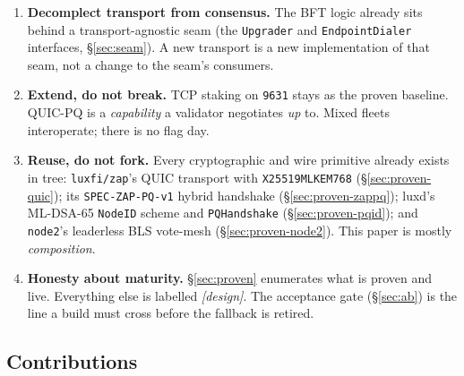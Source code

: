 \documentclass[11pt,a4paper]{article}
\newcommand{\code}[1]{\texttt{#1}}
\begin{document}
\begin{enumerate}[nosep]
  \item \textbf{Decomplect transport from consensus.} The BFT logic
        already sits behind a transport-agnostic seam (the \code{Upgrader}
        and \code{EndpointDialer} interfaces, \S\ref{sec:seam}). A new
        transport is a new implementation of that seam, not a change to
        the seam's consumers.
  \item \textbf{Extend, do not break.} TCP staking on
        \code{9631} stays as the proven baseline. QUIC-PQ is a
        \emph{capability} a validator negotiates \emph{up} to. Mixed
        fleets interoperate; there is no flag day.
  \item \textbf{Reuse, do not fork.} Every cryptographic and wire
        primitive already exists in tree: \code{luxfi/zap}'s QUIC
        transport with \code{X25519MLKEM768}
        (\S\ref{sec:proven-quic}); its \code{SPEC-ZAP-PQ-v1} hybrid
        handshake (\S\ref{sec:proven-zappq}); luxd's ML-DSA-65
        \code{NodeID} scheme and \code{PQHandshake}
        (\S\ref{sec:proven-pqid}); and \code{node2}'s leaderless BLS
        vote-mesh (\S\ref{sec:proven-node2}). This paper is mostly
        \emph{composition}.
  \item \textbf{Honesty about maturity.} \S\ref{sec:proven} enumerates
        what is proven and live. Everything else is labelled
        \emph{[design]}. The acceptance gate (\S\ref{sec:ab}) is the
        line a build must cross before the fallback is retired.
\end{enumerate}

\subsection{Contributions}
\end{document}

